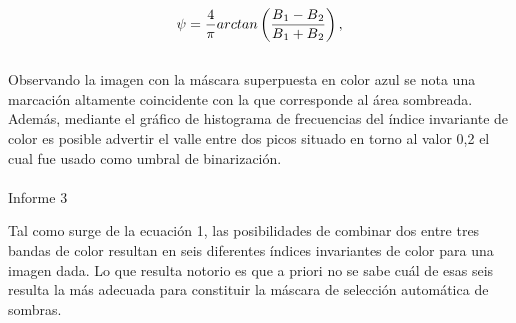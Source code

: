 \\
\begin{equation}
	\psi=\frac{4}{\pi} arctan\left(\frac{B\textsubscript{1}-B\textsubscript{2}}{B\textsubscript{1}+B\textsubscript{2}}\right),\label{invariante de color2}
\end{equation}
\\
Observando la imagen con la máscara superpuesta en color azul se nota una marcación altamente coincidente con la que corresponde al área sombreada. Además, mediante el gráfico de histograma de frecuencias del índice invariante de color es posible advertir el valle entre dos picos situado en torno al valor 0,2 el cual fue usado como umbral de binarización.
\\
\\
Informe 3

Tal como surge de la ecuación 1, las posibilidades de combinar dos entre tres bandas de color resultan en seis diferentes índices invariantes de color para una imagen dada. Lo que resulta notorio es que a priori no se sabe cuál de esas seis resulta la más adecuada para constituir la máscara de selección automática de sombras. 
\color{black}
